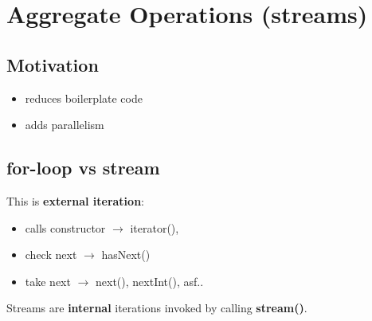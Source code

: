 \documentclass{report}
\begin{document}
\part{Aggregate Operations (streams)}
\chapter{Motivation}
\begin{itemize}
	\item reduces boilerplate code
	\item adds parallelism
\end{itemize}

\chapter{for-loop vs stream}
This is \textbf{external iteration}:
\begin{itemize}
	\item calls constructor $\rightarrow$ iterator(),
	\item check next $\rightarrow$ hasNext()	
	\item take next $\rightarrow$ next(), nextInt(), asf..
\end{itemize}

Streams are \textbf{internal} iterations invoked by calling \textbf{stream()}. 
\end{document}
